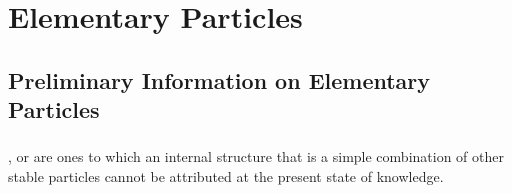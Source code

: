 



\chapter{Elementary Particles}
\label{ch-43}

\section{Preliminary Information on Elementary Particles}
\label{sec-43.1} 




\subsection{}\label{43.1.1} , or  are ones to which an internal structure that is a simple combination of other stable particles cannot be attributed at the present state of knowledge.
%
